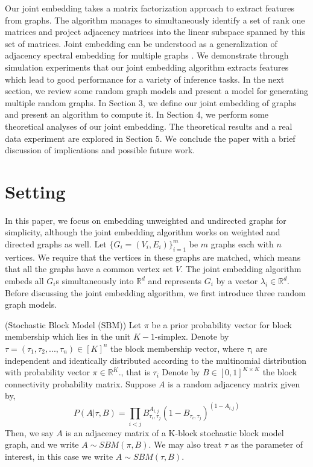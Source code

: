 \documentclass[10pt,journal,compsoc]{IEEEtran}
\newenvironment{definition}[1][Definition]{\begin{trivlist}
		\item[\hskip \labelsep {\bfseries #1}]}{\end{trivlist}}
\begin{document}
\noindent Our joint embedding takes a matrix factorization approach to extract features from graphs. The algorithm manages to simultaneously identify a set of rank one matrices and project adjacency matrices into the linear subspace spanned by this set of matrices. Joint embedding can be understood as a generalization of adjacency spectral embedding for multiple graphs \cite{sussman2012consistent}. We demonstrate through simulation experiments that our joint embedding algorithm extracts features which lead to good performance for a variety of inference tasks. In the next section, we review some random graph models and present a model for generating multiple random graphs. In Section 3, we define our joint embedding of graphs and present an algorithm to compute it. In Section 4, we perform some theoretical analyses of our joint embedding. The theoretical results and a real data experiment are explored in Section 5. We conclude the paper with a brief discussion of implications and possible future work.

\section{Setting}
In this paper, we focus on embedding unweighted and undirected graphs for simplicity, although the joint embedding algorithm works on weighted and directed graphs as well. Let $\{G_i=(V_i,E_i)\} _{i=1}^{m}$ be $m$ graphs each with $n$ vertices. We require that the vertices in these graphs are matched, which means that all the graphs have a common vertex set $V$. The joint embedding algorithm embeds all $G_i$s simultaneously into $\mathbb{R}^d$ and represents $G_i$  by a vector $\lambda_i \in \mathbb{R}^d$. Before discussing the joint embedding algorithm, we first introduce three random graph models.

\begin{definition} (Stochastic Block Model (SBM)) Let $\pi$ be a prior probability vector for block membership which lies in the unit $K-1$-simplex. Denote by $\tau=(\tau_1,\tau_2,...,\tau_n) \in [K]^n$ the block membership vector, where $\tau_i$ are independent and identically distributed according to the multinomial distribution with probability vector $\pi \in \mathbb{R}^K$., that is $\tau_i $ Denote by $B \in [0,1]^{K \times K}$ the block connectivity probability matrix. Suppose $A$ is a random adjacency matrix given by,
\[ P(A|\tau,B)= \prod_{i<j} B_{\tau_i,\tau_j}^{A_{i,j}} (1-B_{\tau_i,\tau_j})^{(1-A_{i,j})}\] 
Then, we say $A$ is an adjacency matrix of a K-block stochastic block model graph, and we write $A \sim SBM(\pi,B)$. We may also treat $\tau$ as the parameter of interest, in this case we write $A \sim SBM(\tau,B)$.
\end{definition}
\end{document}
